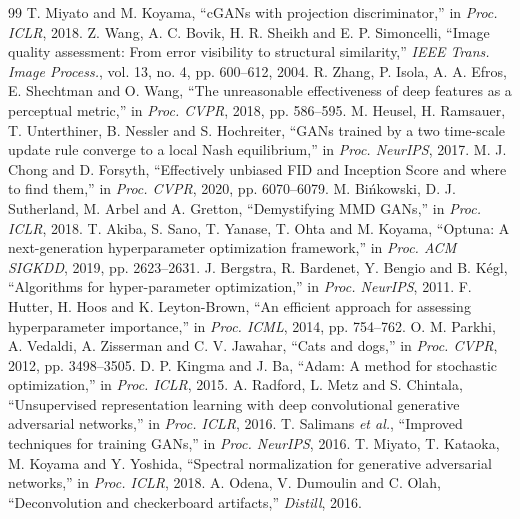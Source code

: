 \documentclass[conference]{IEEEtran}
\begin{document}
\begin{thebibliography}{99}
 T. Miyato and M. Koyama, ``cGANs with projection discriminator,'' in \emph{Proc. ICLR}, 2018.
 Z. Wang, A. C. Bovik, H. R. Sheikh and E. P. Simoncelli, ``Image quality assessment: From error visibility to structural similarity,'' \emph{IEEE Trans. Image Process.}, vol. 13, no. 4, pp. 600--612, 2004.
 R. Zhang, P. Isola, A. A. Efros, E. Shechtman and O. Wang, ``The unreasonable effectiveness of deep features as a perceptual metric,'' in \emph{Proc. CVPR}, 2018, pp. 586--595.
 M. Heusel, H. Ramsauer, T. Unterthiner, B. Nessler and S. Hochreiter, ``GANs trained by a two time-scale update rule converge to a local Nash equilibrium,'' in \emph{Proc. NeurIPS}, 2017.
 M. J. Chong and D. Forsyth, ``Effectively unbiased FID and Inception Score and where to find them,'' in \emph{Proc. CVPR}, 2020, pp. 6070--6079.
 M. Bi\'nkowski, D. J. Sutherland, M. Arbel and A. Gretton, ``Demystifying MMD GANs,'' in \emph{Proc. ICLR}, 2018.
 T. Akiba, S. Sano, T. Yanase, T. Ohta and M. Koyama, ``Optuna: A next-generation hyperparameter optimization framework,'' in \emph{Proc. ACM SIGKDD}, 2019, pp. 2623--2631.
 J. Bergstra, R. Bardenet, Y. Bengio and B. K\'egl, ``Algorithms for hyper-parameter optimization,'' in \emph{Proc. NeurIPS}, 2011.
 F. Hutter, H. Hoos and K. Leyton-Brown, ``An efficient approach for assessing hyperparameter importance,'' in \emph{Proc. ICML}, 2014, pp. 754--762.
 O. M. Parkhi, A. Vedaldi, A. Zisserman and C. V. Jawahar, ``Cats and dogs,'' in \emph{Proc. CVPR}, 2012, pp. 3498--3505.
 D. P. Kingma and J. Ba, ``Adam: A method for stochastic optimization,'' in \emph{Proc. ICLR}, 2015.
 A. Radford, L. Metz and S. Chintala, ``Unsupervised representation learning with deep convolutional generative adversarial networks,'' in \emph{Proc. ICLR}, 2016.
 T. Salimans \emph{et al.}, ``Improved techniques for training GANs,'' in \emph{Proc. NeurIPS}, 2016.
 T. Miyato, T. Kataoka, M. Koyama and Y. Yoshida, ``Spectral normalization for generative adversarial networks,'' in \emph{Proc. ICLR}, 2018.
 A. Odena, V. Dumoulin and C. Olah, ``Deconvolution and checkerboard artifacts,'' \emph{Distill}, 2016.
\end{thebibliography}

\appendices
\end{document}
